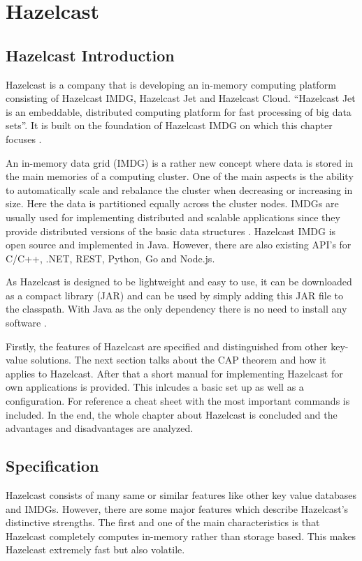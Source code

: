 
\chapter{Hazelcast}

\section{Hazelcast Introduction}

Hazelcast is a company that is developing an in-memory computing platform consisting of Hazelcast IMDG, Hazelcast Jet and Hazelcast Cloud. “Hazelcast Jet is an embeddable, distributed computing platform for fast processing of big data sets”. It is built on the foundation of Hazelcast IMDG on which this chapter focuses \parencite{hazelcast}.

An in-memory data grid (IMDG) is a rather new concept where data is stored in the main memories of a computing cluster. One of the main aspects is the ability to automatically scale and rebalance the cluster when decreasing or increasing in size. Here the data is partitioned equally across the cluster nodes. IMDGs are usually used for implementing distributed and scalable applications since they provide distributed versions of the basic data structures \parencite{tasci2015}. Hazelcast IMDG is open source and implemented in Java. However, there are also existing API’s for C/C++, .NET, REST, Python, Go and Node.js.

As Hazelcast is designed to be lightweight and easy to use, it can be downloaded as a compact library (JAR) and can be used by simply adding this JAR file to the classpath. With Java as the only dependency there is no need to install any software \parencite{hazelcastmanual}.

Firstly, the features of Hazelcast are specified and distinguished from other key-value solutions. The next section talks about the CAP theorem and how it applies to Hazelcast. After that a short manual for implementing Hazelcast for own applications is provided. This inlcudes a basic set up as well as a configuration. For reference a cheat sheet with the most important commands is included. In the end, the whole chapter about Hazelcast is concluded and the advantages and disadvantages are analyzed. 
\section{Specification}
Hazelcast consists of many same or similar features like other key value databases and IMDGs. However, there are some major features which describe Hazelcast’s distinctive strengths.
The first and one of the main characteristics is that Hazelcast completely computes in-memory rather than storage based.  This makes Hazelcast extremely fast but also volatile.

